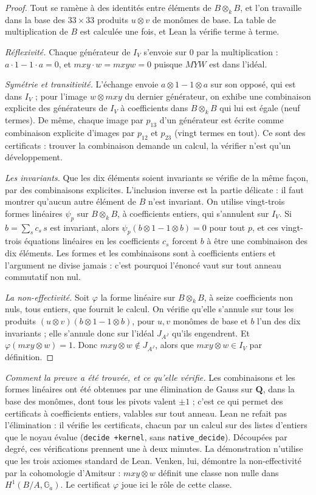 \begin{proof}
Tout se ramène à des identités entre éléments de $B \otimes_k B$, et l'on travaille dans la base des $33 \times 33$ produits $u \otimes v$ de monômes de base. La table de multiplication de $B$ est calculée une fois, et Lean la vérifie terme à terme.

\emph{Réflexivité.} Chaque générateur de $I_V$ s'envoie sur $0$ par la multiplication : $a \cdot 1 - 1 \cdot a = 0$, et $mxy \cdot w = mxyw = 0$ puisque $MYW$ est dans l'idéal.

\emph{Symétrie et transitivité.} L'échange envoie $a \otimes 1 - 1 \otimes a$ sur son opposé, qui est dans $I_V$ ; pour l'image $w \otimes mxy$ du dernier générateur, on exhibe une combinaison explicite des générateurs de $I_V$ à coefficients dans $B \otimes_k B$ qui lui est égale (neuf termes). De même, chaque image par $p_{13}$ d'un générateur est écrite comme combinaison explicite d'images par $p_{12}$ et $p_{23}$ (vingt termes en tout). Ce sont des certificats : trouver la combinaison demande un calcul, la vérifier n'est qu'un développement.

\emph{Les invariants.} Que les dix éléments soient invariants se vérifie de la même façon, par des combinaisons explicites. L'inclusion inverse est la partie délicate : il faut montrer qu'aucun autre élément de $B$ n'est invariant. On utilise vingt-trois formes linéaires $\psi_p$ sur $B \otimes_k B$, à coefficients entiers, qui s'annulent sur $I_V$. Si $b = \sum_s c_s\, s$ est invariant, alors $\psi_p(b \otimes 1 - 1 \otimes b) = 0$ pour tout $p$, et ces vingt-trois équations linéaires en les coefficients $c_s$ forcent $b$ à être une combinaison des dix éléments. Les formes et les combinaisons sont à coefficients entiers et l'argument ne divise jamais : c'est pourquoi l'énoncé vaut sur tout anneau commutatif non nul.

\emph{La non-effectivité.} Soit $\varphi$ la forme linéaire sur $B \otimes_k B$, à seize coefficients non nuls, tous entiers, que fournit le calcul. On vérifie qu'elle s'annule sur tous les produits $(u \otimes v)(b \otimes 1 - 1 \otimes b)$, pour $u, v$ monômes de base et $b$ l'un des dix invariants ; elle s'annule donc sur l'idéal $J_{A^J}$ qu'ils engendrent. Et $\varphi(mxy \otimes w) = 1$. Donc $mxy \otimes w \notin J_{A^J}$, alors que $mxy \otimes w \in I_V$ par définition.
\end{proof}

\emph{Comment la preuve a été trouvée, et ce qu'elle vérifie.} Les combinaisons et les formes linéaires ont été obtenues par une élimination de Gauss sur $\mathbf Q$, dans la base des monômes, dont tous les pivots valent $\pm 1$ ; c'est ce qui permet des certificats à coefficients entiers, valables sur tout anneau. Lean ne refait pas l'élimination : il vérifie les certificats, chacun par un calcul sur des listes d'entiers que le noyau évalue (\texttt{decide +kernel}, sans \texttt{native\_decide}). Découpées par degré, ces vérifications prennent une à deux minutes. La démonstration n'utilise que les trois axiomes standard de Lean. Venken, lui, démontre la non-effectivité par la cohomologie d'Amitsur : $mxy \otimes w$ définit une classe non nulle dans $H^1(B/A, \mathbb G_a)$. Le certificat $\varphi$ joue ici le rôle de cette classe.

